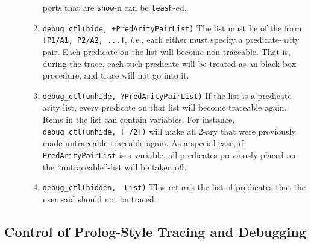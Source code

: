 \begin{description}
\begin{enumerate}
      ports that are {\tt show}-n can be {\tt leash}-ed. 
    \item {\tt debug\_ctl(hide, +PredArityPairList)}  
      The list must be of the form {\tt [P1/A1, P2/A2, ...]}, {\it i.e.},
      each either must specify a predicate-arity pair. Each predicate on
      the list will become non-traceable. That is, during the trace, each
      such predicate will be treated as an black-box procedure, and trace
      will not go into it.
    \item {\tt debug\_ctl(unhide, ?PredArityPairList)} If the list is a
      predicate-arity list, every predicate on that list will become
      traceable again. Items in the list can contain variables. For
      instance, {\tt debug\_ctl(unhide, [\_/2])} will make all 2-ary that
      were previously made untraceable traceable again.  As a special case,
      if {\tt PredArityPairList} is a variable, all predicates previously
      placed on the ``untraceable''-list will be taken off.
    \item {\tt debug\_ctl(hidden, -List)}
      This returns the list of predicates that the user said should not be
      traced.
   \end{enumerate}
\end{description}


\subsection{Control of Prolog-Style Tracing and Debugging}
%
 

